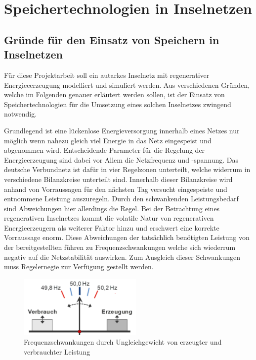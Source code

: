 \section{Speichertechnologien in Inselnetzen}

\subsection{Gründe für den Einsatz von Speichern in Inselnetzen}
Für diese Projektarbeit soll ein autarkes Inselnetz mit regenerativer Energieeerzeugung 
modelliert und simuliert werden.
Aus verschiedenen Gründen, welche im Folgenden genauer erläutert werden sollen, ist der Einsatz von
Speichertechnologien für die Umsetzung eines solchen Inselnetzes zwingend notwendig.

Grundlegend ist eine lückenlose Energieversorgung innerhalb eines Netzes nur möglich wenn nahezu gleich viel Energie in das Netz
eingespeist und abgenommen wird.
Entscheidende Parameter für die Regelung der Energieerzeugung sind dabei vor Allem die Netzfrequenz 
und -spannung.
Das deutsche Verbundnetz ist dafür in vier Regelzonen unterteilt, welche widerrum in verschiedene
Bilanzkreise unterteilt sind.
Innerhalb dieser Bilanzkreise wird anhand von Vorraussagen für den nächsten Tag versucht
eingespeiste und entnommene Leistung auszuregeln.
Durch den schwankenden Leistungsbedarf sind Abweichungen hier allerdings die Regel.
Bei der Betrachtung eines regenerativen Inselnetzes kommt die volatile Natur von regenerativen Energieerzeugern
als weiterer Faktor hinzu und erschwert eine korrekte Vorraussage enorm.
Diese Abweichungen der tatsächlich benötigten Leistung von der bereitgestellten führen zu Frequenzschwankungen
welche sich wiederrum negativ auf die Netzstabilität auswirken.
Zum Ausgleich dieser Schwankungen muss Regelernegie zur Verfügung gestellt werden.

\begin{figure}[h!]
    \centering
    \includegraphics[width=6cm]{Abbildungen/Sollfrequenz.png}
    \caption{Frequenzschwankungen durch Ungleichgewicht von erzeugter und verbrauchter Leistung~\parencite{cronenberg_beschreibung_nodate}}\label{Gleichgewicht}
\end{figure}

